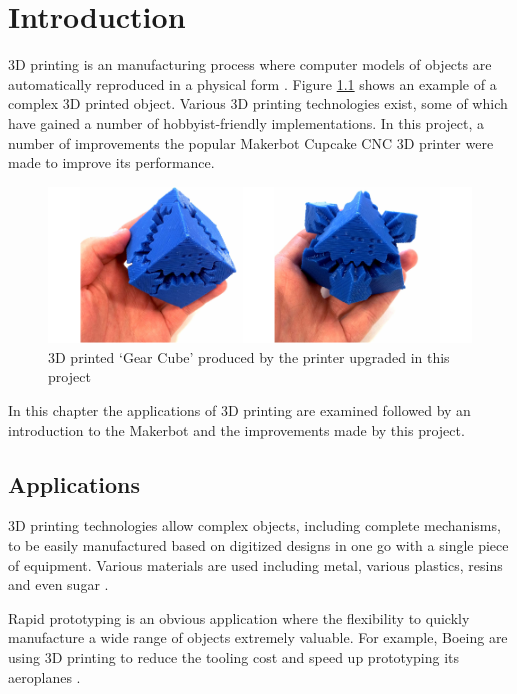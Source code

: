\chapter{Introduction}
	
	
	3D printing is an manufacturing process where computer models of objects are
	automatically reproduced in a physical form \cite{additivemanufacturing}.
	Figure \ref{fig:gearCube} shows an example of a complex 3D printed object.
	Various 3D printing technologies exist, some of which have gained a number of
	hobbyist-friendly implementations. In this project, a number of improvements
	the popular Makerbot Cupcake CNC 3D printer were made to improve its
	performance.
	
	\begin{figure}
		\includegraphics[width=1\textwidth]{diagrams/gearCube.pdf}
		\caption{3D printed `Gear Cube' produced by the printer upgraded in this
		project}
		\label{fig:gearCube}
	\end{figure}
	
	In this chapter the applications of 3D printing are examined followed by an
	introduction to the Makerbot and the improvements made by this project.
	
	\section{Applications}
		
		3D printing technologies allow complex objects, including complete
		mechanisms, to be easily manufactured based on digitized designs in one go
		with a single piece of equipment. Various materials are used including
		metal, various plastics, resins and even sugar \cite{candyfab}.
		
		Rapid prototyping is an obvious application where the flexibility to quickly
		manufacture a wide range of objects extremely valuable. For example, Boeing
		are using 3D printing to reduce the tooling cost and speed up prototyping
		its aeroplanes \cite{boeing3dprint}.
		
